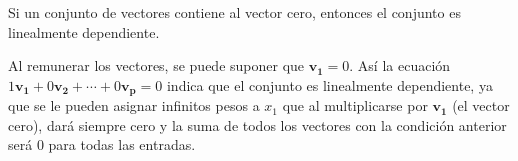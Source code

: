 \documentclass{article}
\begin{document}
\begin{tcolorbox}[colback=red!10!white, colframe=red!70!black, title=Caso especial 2]
    Si un conjunto de vectores contiene al vector cero, entonces el conjunto es linealmente dependiente.
\end{tcolorbox}

Al remunerar los vectores, se puede suponer que $\mathbf{v_1} = 0$. Así la ecuación $1\mathbf{v_1} + 0\mathbf{v_2} + \dotsb + 0\mathbf{v_p} = 0$ indica que el conjunto es linealmente dependiente, ya que se le pueden asignar infinitos pesos a $x_1$ que al multiplicarse por $\mathbf{v_1}$ (el vector cero), dará siempre cero y la suma de todos los vectores con la condición anterior será 0 para todas las entradas. \cite{DavidC}


\end{document}
